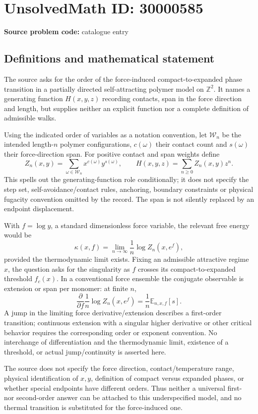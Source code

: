 \documentclass[11pt]{article}
\newcommand{\Z}{\mathbb{Z}}
\begin{document}
\section*{UnsolvedMath ID: 30000585}
\textbf{Source problem code:} catalogue entry
\subsection{Definitions and mathematical statement}
The source asks for the order of the force-induced compact-to-expanded phase transition in a partially directed self-attracting polymer model on \(\Z^2\). It names a generating function \(H(x,y,z)\) recording contacts, span in the force direction and length, but supplies neither an explicit function nor a complete definition of admissible walks.

Using the indicated order of variables as a notation convention, let \(\mathcal W_n\) be the intended length-\(n\) polymer configurations, \(c(\omega)\) their contact count and \(s(\omega)\) their force-direction span. For positive contact and span weights define
\[
 Z_n(x,y)=\sum_{\omega\in\mathcal W_n}x^{c(\omega)}y^{s(\omega)},\qquad
 H(x,y,z)=\sum_{n\geq0}Z_n(x,y)z^n.
\]
This spells out the generating-function role conditionally; it does not specify the step set, self-avoidance/contact rules, anchoring, boundary constraints or physical fugacity convention omitted by the record. The span is not silently replaced by an endpoint displacement.

With \(f=\log y\), a standard dimensionless force variable, the relevant free energy would be
\[
 \kappa(x,f)=\lim_{n\to\infty}\frac1n\log Z_n(x,e^f),
\]
provided the thermodynamic limit exists. Fixing an admissible attractive regime \(x\), the question asks for the singularity as \(f\) crosses its compact-to-expanded threshold \(f_c(x)\). In a conventional force ensemble the conjugate observable is extension or span per monomer: at finite \(n\),
\[
 \frac{\partial}{\partial f}\frac1n\log Z_n(x,e^f)
 =\frac1n\mathbb E_{n,x,f}[s].
\]
A jump in the limiting force derivative/extension describes a first-order transition; continuous extension with a singular higher derivative or other critical behavior requires the corresponding order or exponent convention. No interchange of differentiation and the thermodynamic limit, existence of a threshold, or actual jump/continuity is asserted here.

The source does not specify the force direction, contact/temperature range, physical identification of \(x,y\), definition of compact versus expanded phases, or whether special endpoints have different orders. Thus neither a universal first- nor second-order answer can be attached to this underspecified model, and no thermal transition is substituted for the force-induced one.
\end{document}
